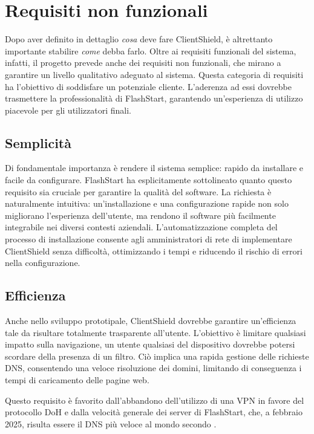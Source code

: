 \documentclass[12pt,a4paper,openright,twoside]{book}
\begin{document}
\section{Requisiti non funzionali}

Dopo aver definito in dettaglio \textit{cosa} deve fare ClientShield, è altrettanto importante stabilire \textit{come} debba farlo.
Oltre ai requisiti funzionali del sistema, infatti, il progetto prevede anche dei requisiti non funzionali, che mirano a garantire un livello qualitativo adeguato al sistema.
Questa categoria di requisiti ha l'obiettivo di soddisfare un potenziale cliente.
L'aderenza ad essi dovrebbe trasmettere la professionalità di FlashStart, garantendo un'esperienza di utilizzo piacevole per gli utilizzatori finali.

\subsection*{Semplicità}

Di fondamentale importanza è rendere il sistema semplice: rapido da installare e facile da configurare.  
FlashStart ha esplicitamente sottolineato quanto questo requisito sia cruciale per garantire la qualità del software.
La richiesta è naturalmente intuitiva: un'installazione e una configurazione rapide non solo migliorano l’esperienza dell’utente, ma rendono il software più facilmente integrabile nei diversi contesti aziendali.  
L'automatizzazione completa del processo di installazione consente agli amministratori di rete di implementare ClientShield senza difficoltà, ottimizzando i tempi e riducendo il rischio di errori nella configurazione.  

\subsection*{Efficienza}

Anche nello sviluppo prototipale, ClientShield dovrebbe garantire un'efficienza tale da risultare totalmente trasparente all'utente.
L'obiettivo è limitare qualsiasi impatto sulla navigazione, un utente qualsiasi del dispositivo dovrebbe potersi scordare della presenza di un filtro.
Ciò implica una rapida gestione delle richieste \gls{DNS}, consentendo una veloce risoluzione dei domini, limitando di conseguenza i tempi di caricamento delle pagine web.

Questo requisito è favorito dall'abbandono dell'utilizzo di una \gls{VPN} in favore del protocollo \gls{DoH} e dalla velocità generale dei server di FlashStart, che, a febbraio 2025, risulta essere il \gls{DNS} più veloce al mondo secondo \cite{DNSPerf2025}.
\end{document}
